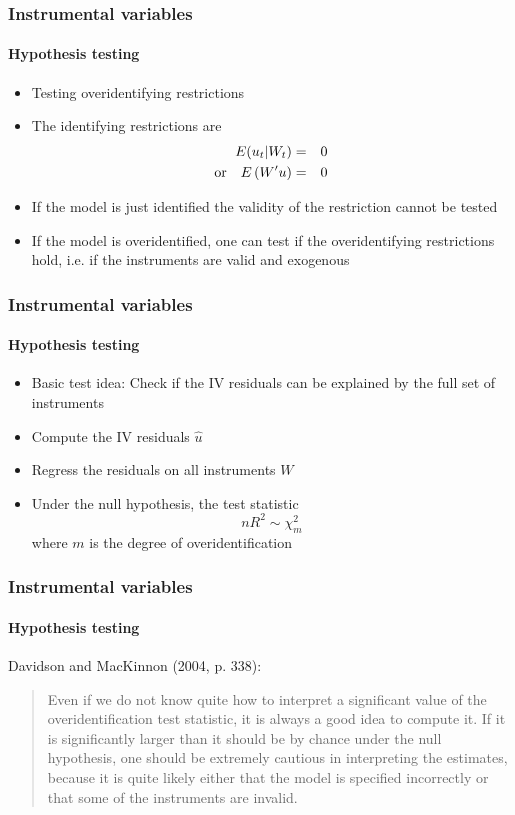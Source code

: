 \documentclass[notes=show]{beamer}
\begin{document}
\begin{frame}\frametitle{Instrumental variables}\framesubtitle{Hypothesis testing}
\begin{itemize}
    \item Testing overidentifying restrictions
    \item The identifying restrictions are
    \begin{eqnarray*}
        E(u_{t}|W_{t}) &=&0 \\
        \text{or\quad }E\left( W^{\prime }u\right) &=&0
    \end{eqnarray*}
    \item If the model is just identified the validity of the restriction cannot be tested
    \item If the model is overidentified, one can test if the overidentifying restrictions hold, i.e. if the instruments are valid and exogenous
\end{itemize}
\end{frame}


\begin{frame}\frametitle{Instrumental variables}\framesubtitle{Hypothesis testing}
\begin{itemize}
    \item Basic test idea: Check if the IV residuals can be explained \newline
    by the full set of instruments
    \item Compute the IV residuals $\hat{u}$
    \item Regress the residuals on all instruments $W$
    \item Under the null hypothesis, the test statistic
    \begin{equation*}
        nR^{2}\sim \chi _{m}^{2}
    \end{equation*}
    where $m$ is the degree of overidentification
\end{itemize}
\end{frame}


\begin{frame}\frametitle{Instrumental variables}\framesubtitle{Hypothesis testing}
Davidson and MacKinnon (2004, p. 338):
\begin{quotation}
    Even if we do not know quite how to interpret a significant value of the overidentification test statistic, it is always a good idea to compute it. If it is significantly larger than it should be by chance under the null hypothesis, one should be extremely cautious in interpreting the estimates, because it is quite likely either that the model is specified incorrectly or that some of the instruments are invalid.
\end{quotation}
\end{frame}
\end{document}
